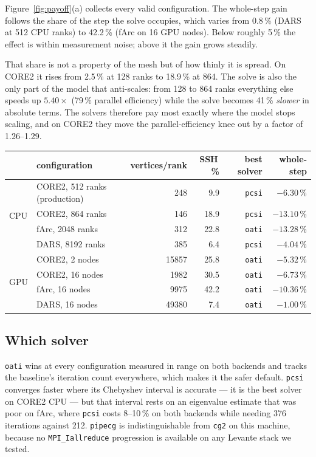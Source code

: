\documentclass[11pt,a4paper]{article}
\begin{document}
Figure~\ref{fig:payoff}(a) collects every valid configuration. The whole-step gain follows the
share of the step the solve occupies, which varies from 0.8\,\% (DARS at 512 CPU ranks) to
42.2\,\% (fArc on 16 GPU nodes). Below roughly 5\,\% the effect is within measurement noise;
above it the gain grows steadily.

That share is not a property of the mesh but of how thinly it is spread. On CORE2 it rises
from 2.5\,\% at 128 ranks to 18.9\,\% at 864. The solve is also the only part of the model
that anti-scales: from 128 to 864 ranks everything else speeds up $5.40\times$ (79\,\% parallel
efficiency) while the solve becomes 41\,\% \emph{slower} in absolute terms. The solvers
therefore pay most exactly where the model stops scaling, and on CORE2 they move the
parallel-efficiency knee out by a factor of 1.26--1.29.

\begin{center}\small
\begin{tabular}{llrrrr}
\toprule
& configuration & vertices/rank & SSH\,\% & best solver & whole-step \\
\midrule
\multirow{4}{*}{CPU}
& CORE2, 512 ranks (production) & 248 & 9.9 & \texttt{pcsi} & $-6.30$\,\% \\
& CORE2, 864 ranks & 146 & 18.9 & \texttt{pcsi} & $-13.10$\,\% \\
& fArc, 2048 ranks & 312 & 22.8 & \texttt{oati} & $-13.28$\,\% \\
& DARS, 8192 ranks & 385 & 6.4 & \texttt{pcsi} & $-4.04$\,\% \\
\midrule
\multirow{4}{*}{GPU}
& CORE2, 2 nodes & 15857 & 25.8 & \texttt{oati} & $-5.32$\,\% \\
& CORE2, 16 nodes & 1982 & 30.5 & \texttt{oati} & $-6.73$\,\% \\
& fArc, 16 nodes & 9975 & 42.2 & \texttt{oati} & $-10.36$\,\% \\
& DARS, 16 nodes & 49380 & 7.4 & \texttt{oati} & $-1.00$\,\% \\
\bottomrule
\end{tabular}
\end{center}

\subsection{Which solver}

\texttt{oati} wins at every configuration measured in range on both backends and tracks the
baseline's iteration count everywhere, which makes it the safer default. \texttt{pcsi}
converges faster where its Chebyshev interval is accurate --- it is the best solver on CORE2
CPU --- but that interval rests on an eigenvalue estimate that was poor on fArc, where
\texttt{pcsi} costs 8--10\,\% on both backends while needing 376 iterations against 212.
\texttt{pipecg} is indistinguishable from \texttt{cg2} on this machine, because no
\texttt{MPI\_Iallreduce} progression is available on any Levante stack we tested.
\end{document}
